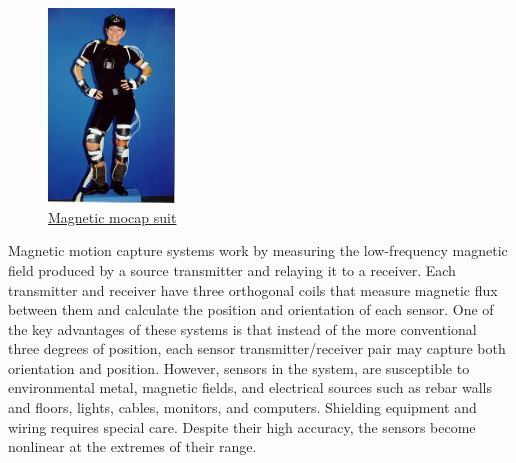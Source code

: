 \begin{figure}[h]
	\centering
	\includegraphics[width=0.3\textwidth]{figures/background/Magnetic.png}
		\caption{\href{https://www.researchgate.net/profile/Jessica-Hodgins-2/publication/2359279/figure/fig4/AS:669524957331457@1536638597171/A-performer-wearing-a-motion-capture-apparatus-The-device-shown-is-a-full-body-magnetic.ppm}
	{Magnetic mocap suit}}
\end{figure}

Magnetic motion capture systems \cite{MOTION CAPTURE TO BUILD A FOUNDATION FOR A COMPUTER-CONTROLLED INSTRUMENT BY STUDY OF CLASSICAL GUITAR PERFORMANCE} work by measuring the low-frequency magnetic field produced by a source transmitter and relaying it to a receiver. Each transmitter and receiver have three orthogonal coils that measure magnetic flux between them and calculate the position and orientation of each sensor. One of the key advantages of these systems is that instead of the more conventional three degrees of position, each sensor transmitter/receiver pair may capture both orientation and position. However, sensors in the system, are susceptible to environmental metal, magnetic fields, and electrical sources such as rebar walls and floors, lights, cables, monitors, and computers. Shielding equipment and wiring requires special care. Despite their high accuracy, the sensors become nonlinear at the extremes of their range.